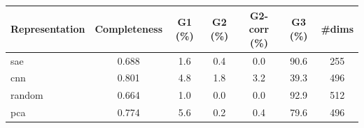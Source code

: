 \begin{tabular}{lcccccc}
\toprule
Representation & Completeness & G1 (\%) & G2 (\%) & G2-corr (\%) & G3 (\%) & \#dims \\
\midrule
sae & 0.688 & 1.6 & 0.4 & 0.0 & 90.6 & 255 \\
cnn & 0.801 & 4.8 & 1.8 & 3.2 & 39.3 & 496 \\
random & 0.664 & 1.0 & 0.0 & 0.0 & 92.9 & 512 \\
pca & 0.774 & 5.6 & 0.2 & 0.4 & 79.6 & 496 \\
\bottomrule
\end{tabular}